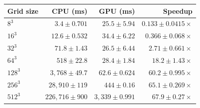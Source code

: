 \begin{tabular}{@{}lrrr@{}}
\toprule
Grid size & CPU (ms) & GPU (ms) & Speedup \\
\midrule
$8^3$ & $3.4 \pm 0.701$ & $25.5 \pm 5.94$ & $0.133 \pm 0.0415\times$ \\
$16^3$ & $12.6 \pm 0.532$ & $34.4 \pm 6.22$ & $0.366 \pm 0.068\times$ \\
$32^3$ & $71.8 \pm 1.43$ & $26.5 \pm 6.44$ & $2.71 \pm 0.661\times$ \\
$64^3$ & $518 \pm 22.8$ & $28.4 \pm 1.84$ & $18.2 \pm 1.43\times$ \\
$128^3$ & $3{,}768 \pm 49.7$ & $62.6 \pm 0.624$ & $60.2 \pm 0.995\times$ \\
$256^3$ & $28{,}910 \pm 119$ & $444 \pm 0.16$ & $65.1 \pm 0.269\times$ \\
$512^3$ & $226{,}716 \pm 900$ & $3{,}339 \pm 0.991$ & $67.9 \pm 0.27\times$ \\
\bottomrule
\end{tabular}
